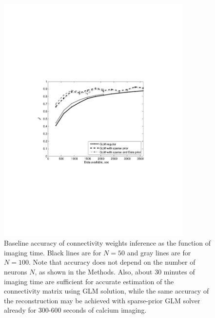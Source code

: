 \begin{figure}
\includegraphics[width=275pt]{../figs/Figure4_perf_vs_T}
\caption{Baseline accuracy of connectivity weights inference as the function of imaging time. Black lines are for $N=50$ and gray lines are for $N=100$. Note that accuracy does not depend on the number of neurons $N$, as shown in the Methods. Also, about 30 minutes of imaging time are sufficient for accurate estimation of the connectivity matrix using GLM solution, while the same accuracy of the reconstruction may be achieved with sparse-prior GLM solver already for 300-600 seconds of calcium imaging.}
\label{fig:data-time}
\end{figure}
